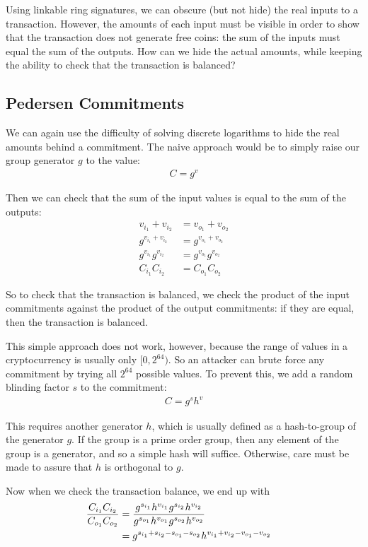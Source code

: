 \documentclass{article}
\begin{document}
Using linkable ring signatures, we can obscure (but not hide) the real inputs to a transaction.  However, the amounts of each input must be visible in order to show that the transaction does not generate free coins: the sum of the inputs must equal the sum of the outputs.  How can we hide the actual amounts, while keeping the ability to check that the transaction is balanced?


\subsection{Pedersen Commitments}

We can again use the difficulty of solving discrete logarithms to hide the real amounts behind a commitment.  The naive approach would be to simply raise our group generator $g$ to the value:
\begin{align}
  C=g^v
\end{align}

Then we can check that the sum of the input values is equal to the sum of the outputs:
\begin{align}
  v_{i_1} + v_{i_2} &= v_{o_1} + v_{o_2}\\
  g^{v_{i_1} + v_{i_2}} &= g^{v_{o_1} + v_{o_2}}\\
  g^{v_{i_1}} g^{v_{i_2}} &= g^{v_{o_1}} g^{v_{o_2}}\\
  C_{i_1} C_{i_2} &= C_{o_1} C_{o_2}
\end{align}
  
So to check that the transaction is balanced, we check the product of the input commitments against the product of the output commitments: if they are equal, then the transaction is balanced.

This simple approach does not work, however, because the range of values in a cryptocurrency is usually only $[0, 2^{64})$.  So an attacker can brute force any commitment by trying all $2^{64}$ possible values.  To prevent this, we add a random blinding factor $s$ to the commitment:
\begin{align}
  C = g^s h^v
\end{align}
  
This requires another generator $h$, which is usually defined as a hash-to-group of the generator $g$.  If the group is a prime order group, then any element of the group is a generator, and so a simple hash will suffice.  Otherwise, care must be made to assure that $h$ is orthogonal to $g$.

Now when we check the transaction balance, we end up with
\begin{align}
  \frac{C_{i_1} C_{i_2}}{C_{o_1} C_{o_2}} &= \frac{g^{s_{i_1}} h^{v_{i_1}} g^{s_{i_2}} h^{v_{i_2}}}{g^{s_{o_1}} h^{v_{o_1}} g^{s_{o_2}} h^{v_{o_2}}}
  \cr &= g^{s_{i_1} + s_{i_2} - s_{o_1} - s_{o_2}} h^{v_{i_1} + v_{i_2} - v_{o_1} - v_{o_2}}
\end{align}
\end{document}
